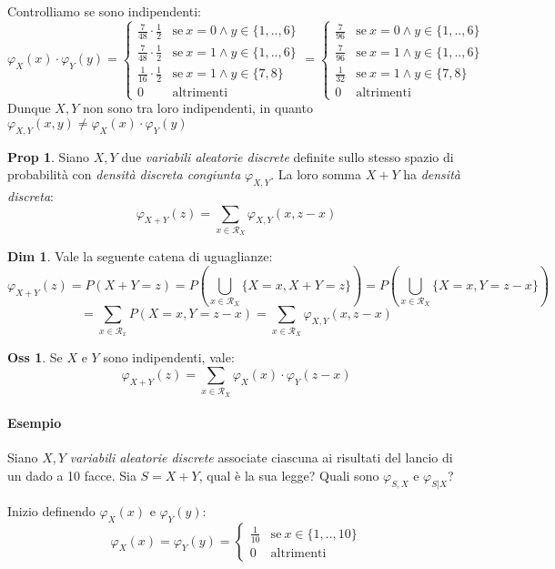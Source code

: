 \documentclass[12pt, a4paper]{report}
\theoremstyle{definition}
\newtheorem*{demonstration}{Dim}
\newtheorem*{proposition}{Prop}
\newtheorem*{observation}{Oss}
\DeclareRobustCommand{\supp}{\mathcal{R}}%
\begin{document}
Controlliamo se sono indipendenti:
\[\varphi_X(x)\cdot \varphi_Y(y)=\begin{cases}
	{\frac{7}{48}\cdot \frac{1}{2}} & \text{se}\ {x=0\wedge y\in\{1,..,6\}}\\
	{\frac{7}{48}\cdot \frac{1}{2}} & \text{se}\ {x=1\wedge y\in\{1,..,6\}}\\
	{\frac{1}{16}\cdot \frac{1}{2}} & \text{se}\ {x=1\wedge y\in\{7,8\}}\\
	{0} & \text{altrimenti}
\end{cases}=\begin{cases}
	{\frac{7}{96}} & \text{se}\ {x=0\wedge y\in\{1,..,6\}}\\
	{\frac{7}{96}} & \text{se}\ {x=1\wedge y\in\{1,..,6\}}\\
	{\frac{1}{32}} & \text{se}\ {x=1\wedge y\in\{7,8\}}\\
	{0} & \text{altrimenti}
\end{cases}\]
Dunque $X,Y$ non sono tra loro indipendenti, in quanto $\varphi_{X,Y}(x,y)\neq
\varphi_X(x)\cdot \varphi_Y(y)$

\begin{proposition}
	Siano $X,Y$ due \emph{variabili aleatorie discrete} definite sullo stesso
	spazio di probabilità con \emph{densità discreta congiunta} $\varphi_{X,Y}$.
	La loro somma $X+Y$ ha \emph{densità discreta}:
	\[\varphi_{X+Y}(z)=\sum_{x\in\supp_X}\varphi_{X,Y}(x,z-x)\]
\end{proposition}
\begin{demonstration}
	Vale la seguente catena di uguaglianze:
	\[\varphi_{X+Y}(z)=P(X+Y=z)=P\left(\bigcup_{x\in\supp_X}\{X=x,X+Y=z\}\right)=
	P\left(\bigcup_{x\in\supp_X}\{X=x,Y=z-x\}\right)\]
	\[=\sum_{x\in\supp_x}P(X=x,Y=z-x)=\sum_{x\in\supp_X}\varphi_{X,Y}(x,z-x)\]
\end{demonstration}
\begin{observation}
	Se $X$ e $Y$ sono indipendenti, vale:
	\[\varphi_{X+Y}(z)=\sum_{x\in\supp_X}\varphi_X(x)\cdot \varphi_Y(z-x)\]
\end{observation}

\newpage
\paragraph*{Esempio}
Siano $X,Y$ \emph{variabili aleatorie discrete} associate ciascuna ai risultati
del lancio di un dado a 10 facce. Sia $S=X+Y$, qual è la sua legge? Quali sono
$\varphi_{S,X}$ e $\varphi_{S|X}$?

Inizio definendo $\varphi_X(x)$ e $\varphi_Y(y)$:
\[\varphi_X(x)=\varphi_Y(y)=\begin{cases}
	{\frac{1}{10}} & \text{se}\ {x\in\{1,..,10\}}\\
	{0} & \text{altrimenti}
\end{cases}\]
\end{document}
